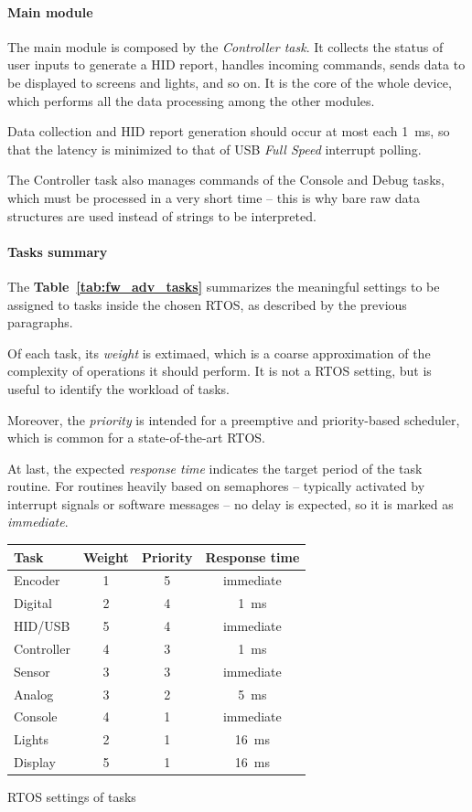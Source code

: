 \documentclass[a4paper,10pt]{article}
\makeatletter
\newenvironment{tablehere}{\def\@captype{table}\vspace{2ex}}{\vspace{2ex}}
\newcommand{\citet}[1]{\textbf{Table~\ref{#1}}}
\makeatother
\begin{document}
\begin{multicols}{2}
\paragraph{Main module}
The main module is composed by the \emph{Controller task}. It collects the
status of user inputs to generate a HID report, handles incoming commands,
sends data to be displayed to screens and lights, and so on. It is the core of
the whole device, which performs all the data processing among the other
modules.

Data collection and HID report generation should occur at most each 1~ms, so
that the latency is minimized to that of USB \emph{Full Speed} interrupt
polling.

The Controller task also manages commands of the Console and Debug tasks,
which must be processed in a very short time -- this is why bare raw data
structures are used instead of strings to be interpreted.


\paragraph{Tasks summary}
The \citet{tab:fw_adv_tasks} summarizes the meaningful settings to be assigned
to tasks inside the chosen RTOS, as described by the previous paragraphs.

Of each task, its \emph{weight} is extimaed, which is a coarse approximation
of the complexity of operations it should perform. It is not a RTOS setting,
but is useful to identify the workload of tasks.

Moreover, the \emph{priority} is intended for a preemptive and priority-based
scheduler, which is common for a state-of-the-art RTOS.

At last, the expected \emph{response time} indicates the target period of the
task routine. For routines heavily based on semaphores -- typically activated
by interrupt signals or software messages -- no delay is expected, so it is
marked as \emph{immediate}.

\begin{tablehere}
\centering \footnotesize
\begin{tabular}{|l|c|c|c|}
\hline
\textbf{Task} & \textbf{Weight} & \textbf{Priority} & \textbf{Response time}	\\
\hline
Encoder		& 1	& 5	& immediate	\\
Digital		& 2	& 4	& 1~ms		\\
HID/USB		& 5	& 4	& immediate	\\
Controller	& 4	& 3	& 1~ms		\\
Sensor		& 3	& 3	& immediate	\\
Analog		& 3	& 2	& 5~ms		\\
Console		& 4	& 1	& immediate	\\
Lights		& 2	& 1	& 16~ms		\\
Display		& 5	& 1	& 16~ms		\\
\hline
\end{tabular}
\caption{RTOS settings of tasks}
\label{tab:fw_adv_tasks}
\end{tablehere}



\end{multicols}
\end{document}
